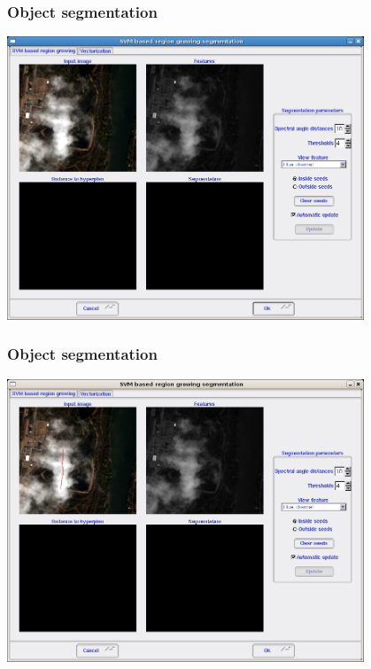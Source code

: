 \documentclass[compress]{beamer}
\begin{document}
\begin{frame}
  \frametitle{Object segmentation}
      \begin{center}
      \includegraphics[width=0.80\textwidth]{Images/seg10.png}
  \end{center}
\end{frame}

\begin{frame}
  \frametitle{Object segmentation}
      \begin{center}
      \includegraphics[width=0.80\textwidth]{Images/seg11.png}
  \end{center}
\end{frame}
\end{document}
